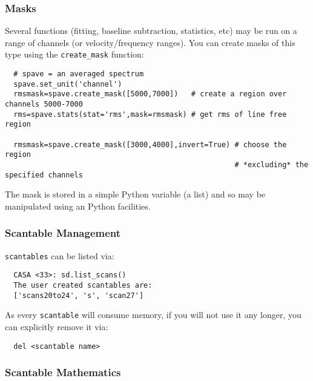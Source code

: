 \subsubsection{Masks}
\label{subsubsection:sd.asap.scantable.masks}

Several functions (fitting, baseline subtraction, statistics, etc) may
be run on a range of channels (or velocity/frequency ranges). You can
create masks of this type using the {\tt create\_mask} function:

\small
\begin{verbatim}
  # spave = an averaged spectrum
  spave.set_unit('channel')
  rmsmask=spave.create_mask([5000,7000])   # create a region over channels 5000-7000
  rms=spave.stats(stat='rms',mask=rmsmask) # get rms of line free region

  rmsmask=spave.create_mask([3000,4000],invert=True) # choose the region 
                                                     # *excluding* the specified channels
\end{verbatim}
\normalsize

The mask is stored in a simple Python variable (a list) and so may be
manipulated using an Python facilities. 

\subsubsection{Scantable Management}
\label{subsubsection:sd.asap.scantable.management}

{\tt scantables} can be listed via:

\small
\begin{verbatim}
  CASA <33>: sd.list_scans()
  The user created scantables are:
  ['scans20to24', 's', 'scan27']
\end{verbatim}
\normalsize

As every {\tt scantable} will consume memory, if you will not use it
any longer, you can explicitly remove it via:

\small
\begin{verbatim}
  del <scantable name>
\end{verbatim}
\normalsize
 
\subsubsection{Scantable Mathematics}
\label{subsubsection:sd.asap.scantable.scanmath}

